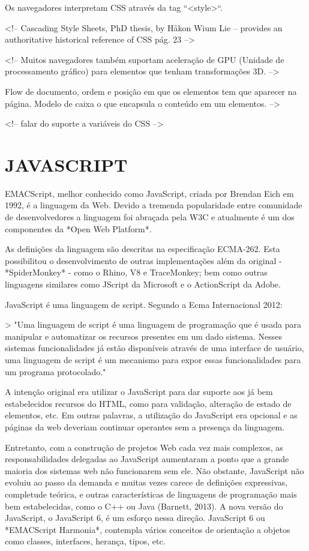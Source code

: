\documentclass[11pt,a4paper]{article}
\begin{document}
Os navegadores interpretam CSS através da tag ``<style>``.

<!-- Cascading Style Sheets, PhD thesis, by Håkon Wium Lie – provides
an authoritative historical reference of CSS pág. 23 -->

<!-- Muitos navegadores também suportam aceleração de GPU (Unidade de
processamento gráfico) para elementos que tenham transformações 3D.
-->

Flow de documento, ordem e posição em que os elementos tem que
aparecer na página. Modelo de caixa o que encapsula o conteúdo em um
elementos. -->

<!-- falar do suporte a variáveis do CSS -->


\section{JAVASCRIPT}

EMACScript, melhor conhecido como JavaScript, criada por Brendan Eich
em 1992, é a linguagem da Web. Devido a tremenda popularidade entre
comunidade de desenvolvedores a linguagem foi abraçada pela W3C e
atualmente é um dos componentes da *Open Web Platform*.

As definições da linguagem são descritas na especificação ECMA-262.
Esta possibilitou o desenvolvimento de outras implementações além da
original - *SpiderMonkey* - como o Rhino, V8 e TraceMonkey; bem como
outras linguagens similares como JScript da Microsoft e o ActionScript
da Adobe.

JavaScript é uma linguagem de script. Segundo a Ecma Internacional
2012:

> "Uma linguagem de script é uma linguagem de programação que é
usada para manipular e automatizar os recursos presentes em um dado
sistema. Nesses sistemas funcionalidades já estão disponíveis
através de uma interface de usuário, uma linguagem de script é
um mecanismo para expor essas funcionalidades para um programa
protocolado."

A intenção original era utilizar o JavaScript para dar suporte aos já
bem estabelecidos recursos do HTML, como para validação, alteração
de estado de elementos, etc. Em outras palavras, a utilização do
JavaScript era opcional e as páginas da web deveriam continuar
operantes sem a presença da linguagem.

Entretanto, com a construção de projetos Web cada vez mais complexos,
as responsabilidades delegadas ao JavaScript aumentaram a ponto que a
grande maioria dos sistemas web não funcionarem sem ele. Não obstante,
JavaScript não evoluiu ao passo da demanda e muitas vezes carece de
definições expressivas, completude teórica, e outras características
de linguagens de programação mais bem estabelecidas, como o C++ ou
Java (Barnett, 2013). A nova versão do JavaScript, o JavaScript 6, é
um esforço nessa direção. JavaScript 6 ou *EMACScript Harmonia*,
contempla vários conceitos de orientação a objetos como classes,
interfaces, herança, tipos, etc.
\end{document}
